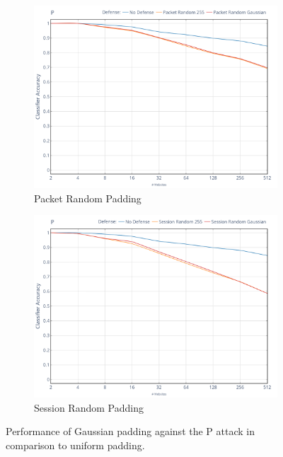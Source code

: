 \documentclass[
	ruledheaders=chapter,
	class=report,
	thesis={type=master, department=inf},
	accentcolor=1c,
	custommargins=true,
	marginpar=false,
	parskip=half-,
	fontsize=11pt,
]{tudapub}
\begin{document}
	\begin{figure}
		\begin{subfigure}{0.495\textwidth}
			\centering
			\includegraphics[width=\textwidth]{plots/performance_p_pkt.png}
			\caption{Packet Random Padding}
		\end{subfigure}
       \hfill
		\begin{subfigure}{0.495\textwidth}
			\centering
			\includegraphics[width=\textwidth]{plots/performance_p_ses.png}
			\caption{Session Random Padding}
		\end{subfigure}
		\caption[Performance of Gaussian padding against the P attack]{Performance of Gaussian padding against the P attack \cite{Panchenko2011} in comparison to uniform padding.}
		\label{fig:p}
	\end{figure}
\end{document}
